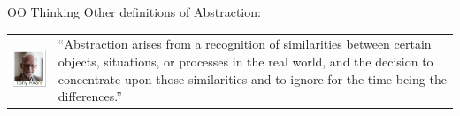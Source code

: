 \documentclass[14pt]{beamer}
\begin{document}
\begin{frame}{OO Thinking}
Other definitions of Abstraction:

\begin{tabular}{l l}
\begin{minipage}{0.25\textwidth}
\includegraphics[scale=.6]{Image12.png}
\end{minipage}
&
\begin{minipage}{0.65\textwidth}
``Abstraction arises from a recognition of similarities between certain objects, situations, or processes in the real world, and the decision to concentrate upon those similarities and to ignore for the time being the differences.''
\end{minipage}
\end{tabular}
\end{frame}
\end{document}
